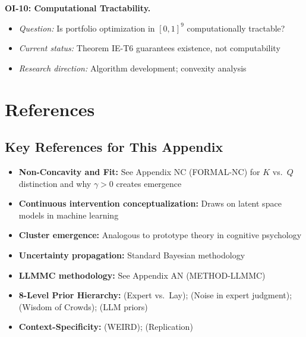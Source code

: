 \begin{tcolorbox}[colback=yellow!5!white, colframe=yellow!75!black,
    title=\textbf{Open Issues: Research Agenda for EIT}]
\textbf{OI-10: Computational Tractability.}
\begin{itemize}[nosep]
    \item \textit{Question:} Is portfolio optimization in $[0,1]^9$ computationally tractable?
    \item \textit{Current status:} Theorem IE-T6 guarantees existence, not computability
    \item \textit{Research direction:} Algorithm development; convexity analysis
\end{itemize}

\end{tcolorbox}


\section{References}
\label{sec:ie-references}

\nocite{bcm_master}

\subsection{Key References for This Appendix}

\begin{itemize}[nosep]
\item \textbf{Non-Concavity and Fit:} See Appendix NC (FORMAL-NC) for $K$ vs.\ $Q$ distinction and why $\gamma > 0$ creates emergence
\item \textbf{Continuous intervention conceptualization:} Draws on latent space models in machine learning
\item \textbf{Cluster emergence:} Analogous to prototype theory in cognitive psychology
\item \textbf{Uncertainty propagation:} Standard Bayesian methodology
\item \textbf{LLMMC methodology:} See Appendix AN (METHOD-LLMMC)
\item \textbf{8-Level Prior Hierarchy:} \citet{dellavigna2016predict, dellavigna2018motivates} (Expert vs.\ Lay); \citet{kahneman2015noise} (Noise in expert judgment); \citet{surowiecki2004wisdom} (Wisdom of Crowds); \citet{zhu2024eliciting, scientificreports2025llmpriors} (LLM priors)
\item \textbf{Context-Specificity:} \citet{henrich2000cooperation} (WEIRD); \citet{camerer2016} (Replication)
\end{itemize}

